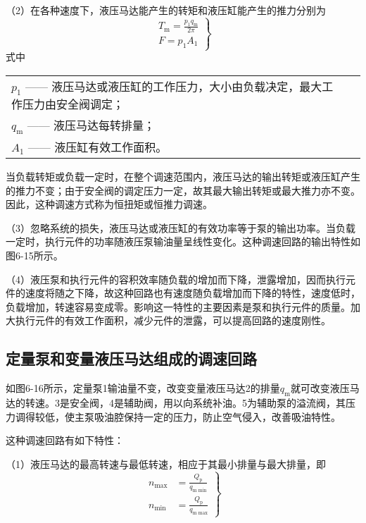 （2）在各种速度下，液压马达能产生的转矩和液压缸能产生的推力分别为
\begin{equation}
\left.
\begin{aligned}
T_\text{m}=\frac{p_\text{1}q_\text{m}}{2\pi}\\
F=p_1A_1
\end{aligned}
\right\}
\end{equation}
\noindent 式中\  
\begin{tabular}[t]{ll}
$p_\text{1}$ ——\hspace{1mm} 液压马达或液压缸的工作压力，大小由负载决定，最大工作压力由安全阀调定；\\
$q_\text{m}$ ——\hspace{1mm} 液压马达每转排量；\\
$A_\text{1}$ ——\hspace{1mm} 液压缸有效工作面积。
\end{tabular}

当负载转矩或负载一定时，在整个调速范围内，液压马达的输出转矩或液压缸产生的推力不变；由于安全阀的调定压力一定，故其最大输出转矩或最大推力亦不变。因此，这种调速方式称为恒扭矩或恒推力调速。

（3）忽略系统的损失，液压马达或液压缸的有效功率等于泵的输出功率。当负载一定时，执行元件的功率随液压泵输油量呈线性变化。这种调速回路的输出特性如图6-15所示。

（4）液压泵和执行元件的容积效率随负载的增加而下降，泄露增加，因而执行元件的速度将随之下降，故这种回路也有速度随负载增加而下降的特性，速度低时，负载增加，转速容易变成零。影响这一特性的主要因素是泵和执行元件的质量。加大执行元件的有效工作面积，减少元件的泄露，可以提高回路的速度刚性。
\subsection{定量泵和变量液压马达组成的调速回路}
如图6-16所示，定量泵1输油量不变，改变变量液压马达2的排量$q_\text{m}$就可改变液压马达的转速。3是安全阀，4是辅助阀，用以向系统补油。5为辅助泵的溢流阀，其压力调得较低，使主泵吸油腔保持一定的压力，防止空气侵入，改善吸油特性。

这种调速回路有如下特性：

（1）液压马达的最高转速与最低转速，相应于其最小排量与最大排量，即
\begin{equation}
\left.
\begin{aligned}
n_\text{max}&=\frac{Q_\text{p}}{q_\text{m\ min}}\\
n_\text{min}&=\frac{Q_\text{p}}{q_\text{m\ max}}
\end{aligned}
\right\}
\end{equation}

